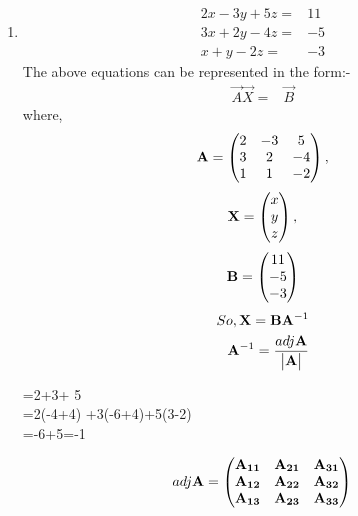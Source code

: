 \documentclass[two column]{article}
\begin{document}
            \begin{enumerate}
            \item
               \begin{align}
                   2x-3y+5z=&11\\
                   3x+2y-4z=&-5\\
                   x+y-2z=&-3
               \end{align}
The above equations can be represented in the form:-
                \begin{align}
                 \vec{A}\vec{X}=&\vec{B}
                 \end{align}
                 where,
                 \begin{align}
                \mathbf{\mathbf{A}}=\begin{pmatrix}2 & -3 & 5\\ 3 & 2 & -4 \\1 & 1 & -2\end{pmatrix},
                 \end{align}
                 \begin{align}
                \mathbf{\mathbf{X}}=\begin{pmatrix}x \\ y \\ z\end{pmatrix},    
                 \end{align}
                 \begin{align}
                     \mathbf{\mathbf{B}}=\begin{pmatrix}11 \\ -5 \\ -3\end{pmatrix}
                 \end{align}
                  \begin{align}
                 So,  \mathbf{X}=\mathbf{B}\mathbf{A}^{-1}
                 \\
                 \mathbf{A}^{-1}=\frac{adj\mathbf{A}}{\begin{vmatrix}\mathbf{A}\end{vmatrix}}
                 \end{align}
                 \begin{multiline}
                  =2+3+ 5\\
                  =2(-4+4) +3(-6+4)+5(3-2)\\
                  =-6+5=-1
                  \end{multiline}
                  \begin{align}
                   adj\vec{A}=\myvec{\vec{A_{11}} & \vec{A_{21}} & \vec{A_{31}}\\\vec{ A_{12}} & \vec{A_{22}} &\vec{A_{32}}\\ \vec{A_{13}} &\vec{A_{23}} & \vec{A_{33}}}

\end{align}
\end{enumerate}
\end{document}
